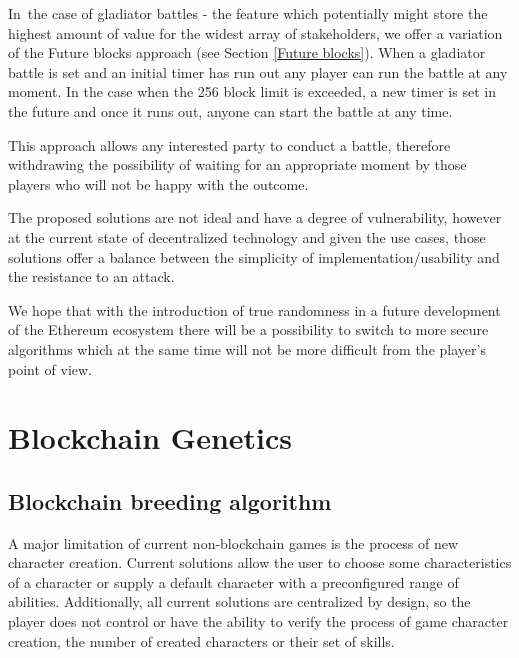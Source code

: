 \documentclass[12pt]{article}
\begin{document}
In\ the case of gladiator battles - the feature which potentially might store the highest amount of value for the widest array of stakeholders, we offer a variation of the Future blocks approach (see Section  \ref{Future blocks}). When a gladiator battle is set and an initial timer has run out any player can run the battle at any moment. In the case when the 256 block limit is exceeded, a new timer is set in the future and once it runs out, anyone can start the battle at any time.\par

This approach allows any interested party to conduct a battle, therefore withdrawing the possibility of waiting for an appropriate moment by those players who will not be happy with the outcome.\par


\vspace{\baselineskip}
The proposed solutions are not ideal and have a degree of vulnerability, however at the current state of decentralized technology and given the use cases, those solutions offer a balance between the simplicity of implementation/usability and the resistance to an attack.\par

We hope that with the introduction of true randomness in a future development of the Ethereum ecosystem there will be a possibility to switch to more secure algorithms which at the same time will not be more difficult from the player’s point of view.\par

\newpage
\vspace{\baselineskip}\section{Blockchain Genetics}
\label{Blockchain Genetics}   \par

\subsection{Blockchain breeding algorithm}
  \label{Blockchain breeding algorithm}  \par

A major limitation of current non-blockchain games is the process of new character creation. Current solutions allow the user to choose some characteristics of a character or supply a default character with a preconfigured range of abilities. Additionally, all current solutions are centralized by design, so the player does not control or have the ability to verify the process of game character creation, the number of created characters or their set of skills.\par
\end{document}
